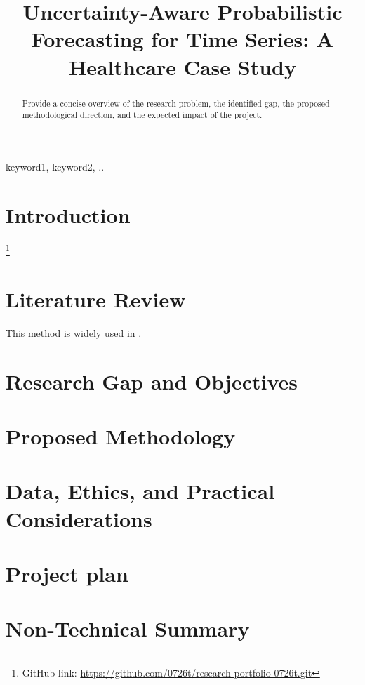 \documentclass[conference]{IEEEtran}
\begin{document}
\title{Uncertainty-Aware Probabilistic Forecasting for Time Series: A Healthcare Case Study}

\author{
}

\maketitle

\begin{abstract}
Provide a concise overview of the research problem, the identified gap, the proposed methodological direction, and the expected impact of the project.
\end{abstract}

\begin{IEEEkeywords}
keyword1, keyword2, ..
\end{IEEEkeywords}

\section{Introduction}
\footnote {GitHub link: \url{https://github.com/0726t/research-portfolio-0726t.git}}


\section{Literature Review}
This method is widely used in  \cite{key2024example}.
\section{Research Gap and Objectives }
\section{Proposed Methodology}
\section{Data, Ethics, and Practical Considerations}
\section{Project plan}
\section{Non-Technical Summary}



\end{document}
